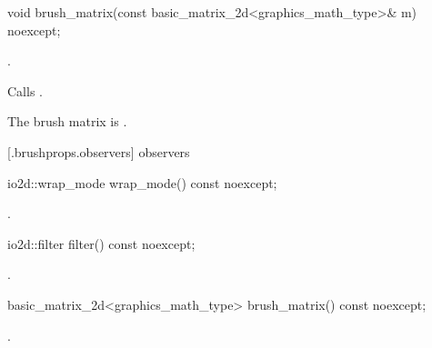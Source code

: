 %
\begin{itemdecl}
void brush_matrix(const basic_matrix_2d<graphics_math_type>& m) noexcept;
\end{itemdecl}
\begin{itemdescr}
\pnum
\requires
{}.

\pnum
\effects
Calls .

\pnum
\remarks
The brush matrix is .
\end{itemdescr}

 [\iotwod.brushprops.observers] { observers}

%
\begin{itemdecl}
io2d::wrap_mode wrap_mode() const noexcept;
\end{itemdecl}
\begin{itemdescr}
\pnum
\returns
{}.
\end{itemdescr}

%
\begin{itemdecl}
io2d::filter filter() const noexcept;
\end{itemdecl}
\begin{itemdescr}
\pnum
\returns
{}.
\end{itemdescr}

%
\begin{itemdecl}
basic_matrix_2d<graphics_math_type> brush_matrix() const noexcept;
\end{itemdecl}
\begin{itemdescr}
\pnum
\returns
{}.
\end{itemdescr}
